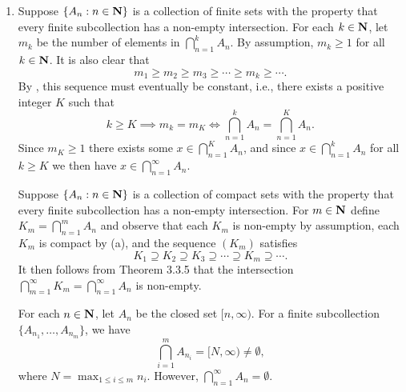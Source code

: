 \documentclass{lew98_solutions}
\begin{document}
\begin{solution}
\begin{enumerate}
        \item Suppose \( \{ A_n : n \in \mathbf{N} \} \) is a collection of finite sets with the property that every finite subcollection has a non-empty intersection. For each \( k \in \mathbf{N} \), let \( m_k \) be the number of elements in \( \bigcap_{n=1}^k A_n \). By assumption, \( m_k \geq 1 \) for all \( k \in \mathbf{N} \). It is also clear that
        \[
            m_1 \geq m_2 \geq m_3 \geq \cdots \geq m_k \geq \cdots.
        \]
        By , this sequence must eventually be constant, i.e., there exists a positive integer \( K \) such that
        \[
            k \geq K \implies m_k = m_K \iff \bigcap_{n=1}^k A_n = \bigcap_{n=1}^K A_n.
        \]
        Since \( m_K \geq 1 \) there exists some \( x \in \bigcap_{n=1}^K A_n \), and since \( x \in \bigcap_{n=1}^k A_n \) for all \( k \geq K \) we then have \( x \in \bigcap_{n=1}^{\infty} A_n \).

        Suppose \( \{ A_n : n \in \mathbf{N} \} \) is a collection of compact sets with the property that every finite subcollection has a non-empty intersection. For \( m \in \mathbf{N} \) define \( K_m = \bigcap_{n=1}^m A_n \) and observe that each \( K_m \) is non-empty by assumption, each \( K_m \) is compact by  (a), and the sequence \( (K_m) \) satisfies
        \[
            K_1 \supseteq K_2 \supseteq K_3 \supseteq \cdots \supseteq K_m \supseteq \cdots.
        \]
        It then follows from Theorem 3.3.5 that the intersection \( \bigcap_{m=1}^{\infty} K_m = \bigcap_{n=1}^{\infty} A_n \) is non-empty.

        For each \( n \in \mathbf{N} \), let \( A_n \) be the closed set \( [n, \infty) \). For a finite subcollection \( \{ A_{n_1}, \ldots, A_{n_m} \} \), we have
        \[
            \bigcap_{i=1}^m A_{n_i} = [N, \infty) \neq \emptyset,
        \]
        where \( N = \max_{1 \leq i \leq m} n_i \). However, \( \bigcap_{n=1}^{\infty} A_n = \emptyset \).
    \end{enumerate}
\end{solution}
\end{document}
